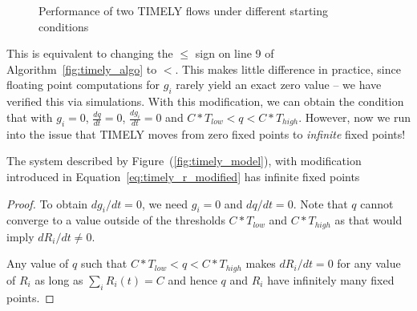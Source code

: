 \begin{figure}[t]
\center
{}
\vspace{-1em}
\caption{Performance of two TIMELY flows under different starting conditions}
\label{fig:timely_unstable}
\vspace{-1em}
\end{figure}

This is equivalent to changing the $\le$ sign on line 9 of
Algorithm~\ref{fig:timely_algo} to $<$. This makes little difference in
practice, since floating point computations for $g_i$ rarely yield an exact zero
value -- we have verified this via simulations. With this modification, we can
obtain the condition that with $g_i =0$, $\tfrac{dq}{dt} = 0$, $\tfrac{dg_i}{dt} =
0$ and $C*T_{low} < q < C*T_{high}$. However, now we run into the issue that
TIMELY moves from zero fixed points to \emph{infinite} fixed points!

\begin{thm}
The system described by Figure~(\ref{fig:timely_model}), with
modification introduced in Equation~\ref{eq:timely_r_modified} has
infinite fixed points
\end{thm}
\begin{proof}
To obtain ${dg_i}/{dt} =0$, we need $g_i = 0$ and ${dq}/{dt} = 0$.  Note that $q$
cannot converge to a value outside of the thresholds $ C*{T_{low}}$ and
$C*{T_{high}}$ as that would imply ${dR_i}/{dt} \ne 0$.

Any value of $q$ such that $C*T_{low} < q < C*T_{high}$ makes ${dR_i}/{dt} = 0$
for any value of $R_i$ as long as $\sum_{i} R_i(t) =  C$ and hence $q$
and $R_i$ have
infinitely many fixed points. 
\end{proof}


